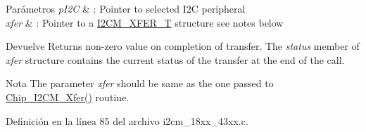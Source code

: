 \begin{DoxyParams}{Parámetros}
{\em p\+I2C} & \+: Pointer to selected I2C peripheral \\
\hline
{\em xfer} & \+: Pointer to a \hyperlink{struct_i2_c_m___x_f_e_r___t}{I2\+C\+M\+\_\+\+X\+F\+E\+R\+\_\+T} structure see notes below \\
\hline
\end{DoxyParams}
\begin{DoxyReturn}{Devuelve}
Returns non-\/zero value on completion of transfer. The {\itshape status} member of {\itshape xfer} structure contains the current status of the transfer at the end of the call. 
\end{DoxyReturn}
\begin{DoxyNote}{Nota}
The parameter {\itshape xfer} should be same as the one passed to \hyperlink{group___i2_c_m__18_x_x__43_x_x_gad4b7e6761dd2450e45463a5acef9ee1a}{Chip\+\_\+\+I2\+C\+M\+\_\+\+Xfer()} routine. 
\end{DoxyNote}


Definición en la línea 85 del archivo i2cm\+\_\+18xx\+\_\+43xx.\+c.

